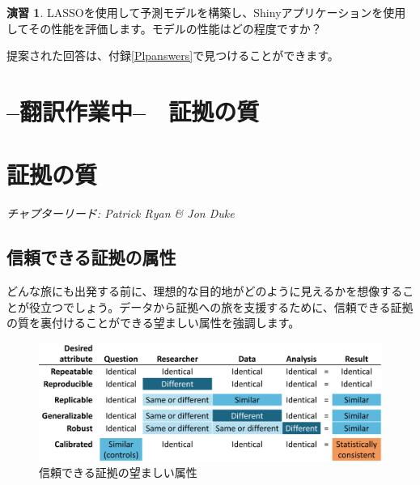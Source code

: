 \documentclass[
  11pt]{book}
\theoremstyle{definition}
\theoremstyle{definition}
\theoremstyle{definition}
\newtheorem{exercise}{演習}[chapter]
\theoremstyle{definition}
\theoremstyle{remark}
\begin{document}
\begin{exercise}
\protect\hypertarget{exr:exercisePlp3}{}\label{exr:exercisePlp3}LASSOを使用して予測モデルを構築し、Shinyアプリケーションを使用してその性能を評価します。モデルの性能はどの程度ですか？
\end{exercise}

提案された回答は、付録\ref{Plpanswers}で見つけることができます。

\chapter*{--翻訳作業中--　証拠の質}\label{ux7ffbux8a33ux4f5cux696dux4e2d-ux8a3cux62e0ux306eux8cea}

\chapter{証拠の質}\label{EvidenceQuality}

\emph{チャプターリード: Patrick Ryan \& Jon Duke}


\section{信頼できる証拠の属性}\label{ux4fe1ux983cux3067ux304dux308bux8a3cux62e0ux306eux5c5eux6027}

どんな旅にも出発する前に、理想的な目的地がどのように見えるかを想像することが役立つでしょう。データから証拠への旅を支援するために、信頼できる証拠の質を裏付けることができる望ましい属性を強調します。

\begin{figure}

{\centering \includegraphics[width=1\linewidth]{images/EvidenceQuality/reliableevidenceattributes} 

}

\caption{信頼できる証拠の望ましい属性}\label{fig:attributesOfEvidence}
\end{figure}
\end{document}
